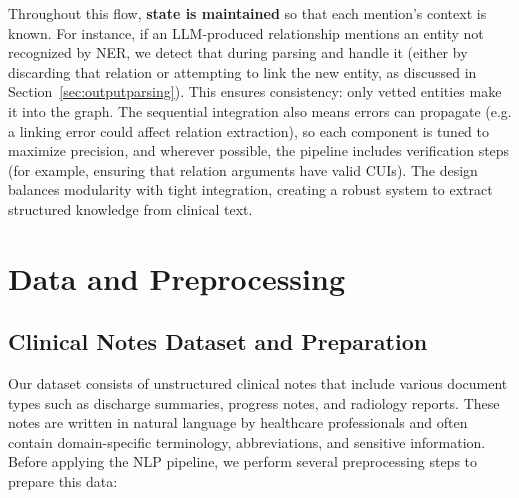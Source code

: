 Throughout this flow, \textbf{state is maintained} so that each mention's context is known. For instance, if an LLM-produced relationship mentions an entity not recognized by NER, we detect that during parsing and handle it (either by discarding that relation or attempting to link the new entity, as discussed in Section~\ref{sec:outputparsing}). This ensures consistency: only vetted entities make it into the graph. The sequential integration also means errors can propagate (e.g. a linking error could affect relation extraction), so each component is tuned to maximize precision, and wherever possible, the pipeline includes verification steps (for example, ensuring that relation arguments have valid CUIs). The design balances modularity with tight integration, creating a robust system to extract structured knowledge from clinical text.

\section{Data and Preprocessing}
\label{sec:datapreprocessing}

\subsection{Clinical Notes Dataset and Preparation}

Our dataset consists of unstructured clinical notes that include various document types such as discharge summaries, progress notes, and radiology reports. These notes are written in natural language by healthcare professionals and often contain domain-specific terminology, abbreviations, and sensitive information. Before applying the NLP pipeline, we perform several preprocessing steps to prepare this data:

